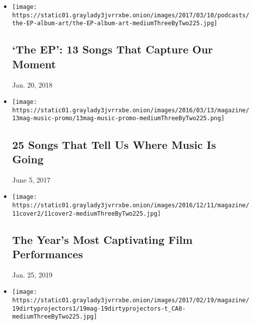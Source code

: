 \begin{itemize}
\item
  \href{https://www.nytimes3xbfgragh.onion/2017/03/08/podcasts/the-ep-13-songs-that-capture-our-moment.html}{}

  \texttt{[image: https://static01.graylady3jvrrxbe.onion/images/2017/03/10/podcasts/the-EP-album-art/the-EP-album-art-mediumThreeByTwo225.jpg]}

  \hypertarget{the-ep-13-songs-that-capture-our-moment}{%
  \subsection{`The EP': 13 Songs That Capture Our
  Moment}\label{the-ep-13-songs-that-capture-our-moment}}

  Jan. 20, 2018
\item
  \href{https://www.nytimes3xbfgragh.onion/interactive/2016/03/10/magazine/25-songs-that-tell-us-where-music-is-going.html}{}

  \texttt{[image: https://static01.graylady3jvrrxbe.onion/images/2016/03/13/magazine/13mag-music-promo/13mag-music-promo-mediumThreeByTwo225.png]}

  \hypertarget{25-songs-that-tell-us-where-music-is-going-1}{%
  \subsection{25 Songs That Tell Us Where Music Is
  Going}\label{25-songs-that-tell-us-where-music-is-going-1}}

  June 5, 2017
\item
  \href{https://www.nytimes3xbfgragh.onion/2016/12/08/magazine/great-performers-la-noir-the-years-most-captivating-film-performances.html}{}

  \texttt{[image: https://static01.graylady3jvrrxbe.onion/images/2016/12/11/magazine/11cover2/11cover2-mediumThreeByTwo225.jpg]}

  \hypertarget{the-years-most-captivating-film-performances}{%
  \subsection{The Year's Most Captivating Film
  Performances}\label{the-years-most-captivating-film-performances}}

  Jan. 25, 2019
\item
  \href{https://www.nytimes3xbfgragh.onion/2017/02/16/magazine/the-dirty-projectors-go-solo.html}{}

  \texttt{[image: https://static01.graylady3jvrrxbe.onion/images/2017/02/19/magazine/19dirtyprojectors1/19mag-19dirtyprojectors-t\_CA0-mediumThreeByTwo225.jpg]}


\end{itemize}
